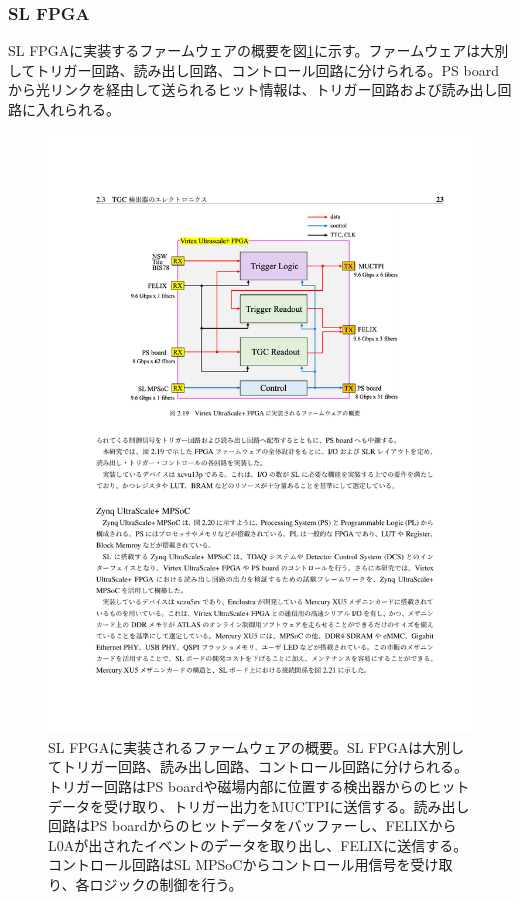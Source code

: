     \subsubsection{SL FPGA}
SL FPGAに実装するファームウェアの概要を図\ref{SL_FW_overview}に示す。ファームウェアは大別してトリガー回路、読み出し回路、コントロール回路に分けられる。PS boardから光リンクを経由して送られるヒット情報は、トリガー回路および読み出し回路に入れられる。

\begin{figure} 
\centering
\includegraphics[width=16cm]{fig/Intro/SL_FW_overview.pdf}
\caption[SL FPGAに実装されるファームウェアの概要]{SL FPGAに実装されるファームウェアの概要\cite{mt_mishima}。SL FPGAは大別してトリガー回路、読み出し回路、コントロール回路に分けられる。トリガー回路はPS boardや磁場内部に位置する検出器からのヒットデータを受け取り、トリガー出力をMUCTPIに送信する。読み出し回路はPS boardからのヒットデータをバッファーし、FELIXからL0Aが出されたイベントのデータを取り出し、FELIXに送信する。コントロール回路はSL MPSoCからコントロール用信号を受け取り、各ロジックの制御を行う。}
\label{SL_FW_overview}
\end{figure}


